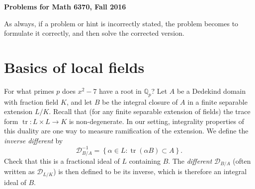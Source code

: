 \documentclass[11pt,answers,addpoints,reqno]{exam}
\theoremstyle{definition}
\theoremstyle{remark}
\theoremstyle{definition}
\theoremstyle{remark}
\theoremstyle{remark}
\newcommand{\Q}{\mathbb{Q}}
\DeclareMathOperator{\tr}{tr}
\newcommand{\mc}{\mathcal}
\begin{document}
\begin{center}
\bf{Problems for Math 6370, Fall 2016}
\end{center}
As always, if a problem or hint is incorrectly stated, the problem becomes to formulate it correctly, and then solve the corrected version.
\section{Basics of local fields}

\begin{questions}
\question For what primes $p$ does $x^2-7$ have a root in $\Q_p$?
\question Let $A$ be a Dedekind domain with fraction field $K$, and let $B$ be
the integral closure of $A$ in a finite separable extension $L/K$. Recall that (for any finite separable extension of fields) the trace form $\tr \colon L \times L \to K$ is non-degenerate. In our setting, integrality properties of this duality are one way to measure ramification of the extension. We define the \textit{inverse different} by
\[
\mc{D}^{-1}_{B/A}= \left\{ \alpha \in L: \tr(\alpha B) \subset A \right\}. 
\]
Check that this is a fractional ideal of $L$ containing $B$. The \textit{different} $\mc{D}_{B/A}$ (often written as $\mc{D}_{L/K}$) is then defined to be its inverse, which is therefore an integral ideal of $B$.
\end{questions}
\end{document}
